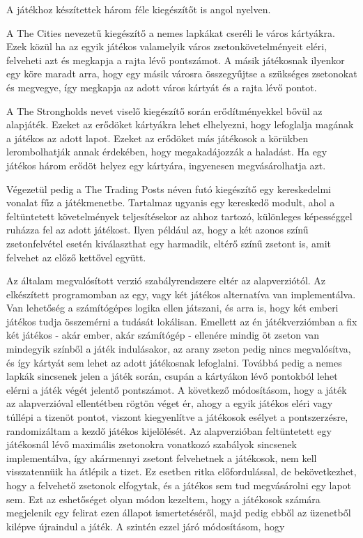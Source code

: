 
A játékhoz készítettek három féle kiegészítőt is angol nyelven.\par 

A The Cities nevezetű kiegészítő a nemes lapkákat cseréli le város kártyákra. Ezek közül ha az egyik játékos valamelyik város zsetonkövetelményeit eléri, felveheti azt és megkapja a rajta lévő pontszámot. A másik játékosnak ilyenkor egy köre maradt arra, hogy egy másik városra összegyűjtse a szükséges zsetonokat és megvegye, így megkapja az adott város kártyát és a rajta lévő pontot.\par

A The Strongholds nevet viselő kiegészítő során erődítményekkel bővül az alapjáték. Ezeket az erődöket kártyákra lehet elhelyezni, hogy lefoglalja magának a játékos az adott lapot. Ezeket az erődöket más játékosok a körükben lerombolhatják annak érdekében, hogy megakadájozzák a haladást. Ha egy játékos három erődöt helyez egy kártyára, ingyenesen megvásárolhatja azt.\par

Végezetül pedig a  The Trading Posts néven futó kiegészítő egy kereskedelmi vonalat fűz a játékmenetbe. Tartalmaz ugyanis egy kereskedő modult, ahol a feltüntetett követelmények teljesítésekor az ahhoz tartozó, különleges képességgel ruházza fel az adott játékost. Ilyen például az, hogy a két azonos színű zsetonfelvétel esetén kiválaszthat egy harmadik, eltérő színű zsetont is, amit felvehet az előző kettővel együtt.


Az általam megvalósított verzió szabályrendszere eltér az alapverziótól. Az elkészített programomban az egy, vagy két játékos alternatíva van implementálva. Van lehetőség a számítógépes logika ellen játszani, és arra is, hogy két emberi játékos tudja összemérni a tudását lokálisan. Emellett az én játékverziómban a fix két játékos - akár ember, akár számítógép - ellenére mindig öt zseton van mindegyik színből a játék indulásakor, az arany zseton pedig nincs megvalósítva, és így kártyát sem lehet az adott játékosnak lefoglalni. Továbbá pedig a nemes lapkák sincsenek jelen a játék során, csupán a kártyákon lévő pontokból lehet elérni a játék végét jelentő pontszámot. A következő módosításom, hogy a játék az alapverzióval ellentétben rögtön véget ér, ahogy a egyik játékos eléri vagy túllépi a tizenöt pontot, viszont kiegyenlítve a játékosok esélyet a pontszerzésre, randomizáltam a kezdő játékos kijelölését. Az alapverzióban feltüntetett egy játékosnál lévő maximális zsetonokra vonatkozó szabályok sincsenek implementálva, így akármennyi zsetont felvehetnek a játékosok, nem kell visszatennüik ha átlépik a tizet. Ez esetben ritka előfordulással, de bekövetkezhet, hogy a felvehető zsetonok elfogytak, és a játékos sem tud megvásárolni egy lapot sem. Ezt az eshetőséget olyan módon kezeltem, hogy a játékosok számára megjelenik egy felirat ezen állapot ismertetéséről, majd pedig ebből az üzenetből kilépve újraindul a játék. A szintén ezzel járó módosításom, hogy 

